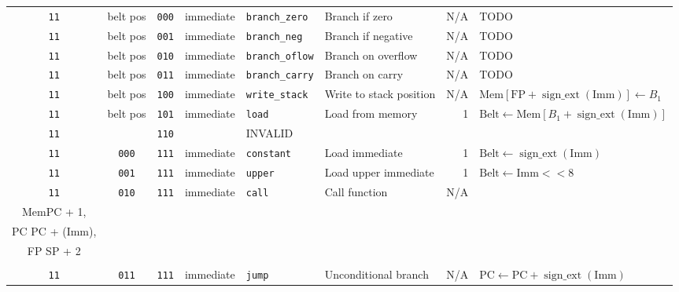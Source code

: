 \documentclass{article}
\begin{document}
\begin{landscape}
\begin{longtable}{c c c c l l r l}
		\texttt{11} & belt pos & \texttt{000} & immediate & \texttt{branch\_zero}  & Branch if zero          & N/A & TODO \\
		\texttt{11} & belt pos & \texttt{001} & immediate & \texttt{branch\_neg}   & Branch if negative      & N/A & TODO \\
		\texttt{11} & belt pos & \texttt{010} & immediate & \texttt{branch\_oflow} & Branch on overflow      & N/A & TODO \\
		\texttt{11} & belt pos & \texttt{011} & immediate & \texttt{branch\_carry} & Branch on carry         & N/A & TODO \\
		\texttt{11} & belt pos & \texttt{100} & immediate & \texttt{write\_stack}  & Write to stack position & N/A & \(
			\textrm{Mem}\left[\textrm{FP} + \operatorname{sign\_ext}\left(\textrm{Imm}\right)\right] \gets B_1\) \\
		\texttt{11} & belt pos & \texttt{101} & immediate & \texttt{load}          & Load from memory        & 1   & \(
			\textrm{Belt} \gets \textrm{Mem}\left[B_1 + \operatorname{sign\_ext}\left(\textrm{Imm}\right)\right]\) \\
		\texttt{11} & & \texttt{110} & & INVALID & \\
		\texttt{11} & \texttt{000} & \texttt{111} & immediate & \texttt{constant}    & Load immediate           & 1   & \(
			\textrm{Belt} \gets \operatorname{sign\_ext}\left(\textrm{Imm}\right)\) \\
		\texttt{11} & \texttt{001} & \texttt{111} & immediate & \texttt{upper}       & Load upper immediate     & 1   & \(
			\textrm{Belt} \gets \textrm{Imm} << 8\) \\
		\texttt{11} & \texttt{010} & \texttt{111} & immediate & \texttt{call}        & Call function            & N/A & \(
			\begin{array}{l}
				\textrm{Mem}\left[\textrm{SP}\right] \gets \textrm{FP}, \\
				\textrm{Mem}\left[\textrm{SP} + 1\right] \gets \textrm{PC} + 1, \\
				\textrm{PC} \gets \textrm{PC} + \operatorname{sign\_ext}\left(\textrm{Imm}\right), \\
				\textrm{FP} \gets \textrm{SP} + 2 \\
			\end{array}\) \\
		\texttt{11} & \texttt{011} & \texttt{111} & immediate & \texttt{jump}        & Unconditional branch     & N/A & \(
			\textrm{PC} \gets \textrm{PC} + \operatorname{sign\_ext}\left(\textrm{Imm}\right)\) \\

\end{longtable}
\end{landscape}
\end{document}
